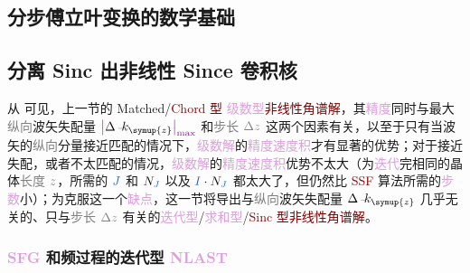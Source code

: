 \subsection{分步傅立叶变换的数学基础}\label{ssec:NLSSF_math}



\subsection{分离 Sinc 出非线性 Since 卷积核}\label{ssec:NLAST_sinc}

从  可见，上一节的 \textcolor{PineGreen}{Matched}/\textcolor{Maroon}{Chord 型} \textcolor{Plum}{级数型}\textcolor{Maroon}{非线性角谱解}，其\textcolor{Plum}{精度}同时与最大\textcolor{gray}{纵向}\textcolor{PineGreen}{波矢失配量} $\textcolor{Plum}{\left|\textcolor{black}{\Delta \xint{\begin{smallmatrix} ~ \\ {}^{}_{\mathcolor{gray}{-}} \\ ~ \end{smallmatrix}}{15}{k}_{\symup{z}}}\right|_{\max}}$ 和\textcolor{gray}{步长} $\mathcolor{gray}{\Delta z}$ 这两个因素有关，以至于只有当\textcolor{PineGreen}{波矢}的\textcolor{gray}{纵向}分量接近\textcolor{PineGreen}{匹配}的情况下，\textcolor{Plum}{级数解}的\textcolor{Plum}{精度速度积}才有显著的优势；对于接近\textcolor{PineGreen}{失配}，或者不太\textcolor{PineGreen}{匹配}的情况，\textcolor{Plum}{级数解}的\textcolor{Plum}{精度速度积}优势不太大（为\textcolor{Plum}{迭代}完相同的\textcolor{PineGreen}{晶体}\textcolor{gray}{长度} $\textcolor{gray}{z}$，所需的 $\textcolor{NavyBlue}{J}$ 和 $N_{\textcolor{NavyBlue}{J}}$ 以及 $\textcolor{NavyBlue}{I} \cdot N_{\textcolor{NavyBlue}{J}}$ 都太大了，但仍然比 \textcolor{Maroon}{SSF} 算法所需的\textcolor{Plum}{步数}小）；为克服这一个\textcolor{Plum}{缺点}，这一节将导出与\textcolor{gray}{纵向}\textcolor{PineGreen}{波矢失配量} $\Delta \xint{\begin{smallmatrix} ~ \\ {}^{}_{\mathcolor{gray}{-}} \\ ~ \end{smallmatrix}}{15}{k}_{\symup{z}}$ 几乎无关的、只与\textcolor{gray}{步长} $\mathcolor{gray}{\Delta z}$ 有关的\textcolor{Plum}{迭代型}/\textcolor{Plum}{求和型}/\textcolor{Maroon}{Sinc 型}\textcolor{Maroon}{非线性角谱解}。

\subsubsection{\textcolor{Plum}{SFG} 和频过程的迭代型 \textcolor{Plum}{NLAST}}\label{sssec:NLAST_sinc_SFG}


